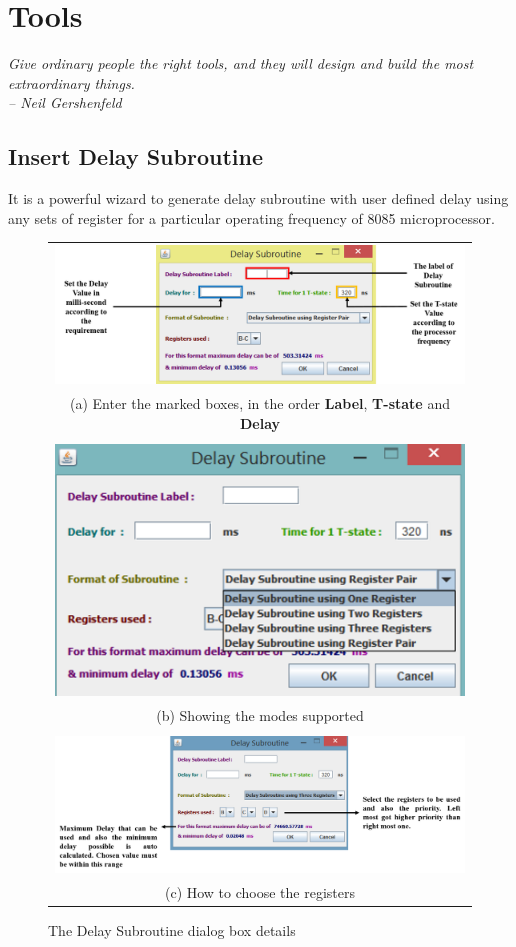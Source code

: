 \chapter{Tools}
\emph{Give ordinary people the right tools, and they will design and build the most extraordinary things.\\ -- Neil Gershenfeld}
\newpage
\section{Insert Delay Subroutine}
It is a powerful wizard to generate delay subroutine with user defined delay using any sets of register for a particular operating frequency of 8085 microprocessor.

\begin{figure}[htbp]
	\centering
	\begin{tabular}{c}
		\includegraphics[width=0.8\linewidth]{delay_sub_mark}\\
		(a) Enter the marked boxes, in the order \textbf{Label}, \textbf{T-state} and \textbf{Delay}\\\\
		\includegraphics[width=0.5\linewidth]{delay_sub_reg}\\
		(b) Showing the modes supported\\\\
		\includegraphics[width=1\linewidth]{delay_sub_reg_choose}\\
		(c)	How to choose the registers
	\end{tabular}
	\caption{The Delay Subroutine dialog box details}
\end{figure}
\newpage

